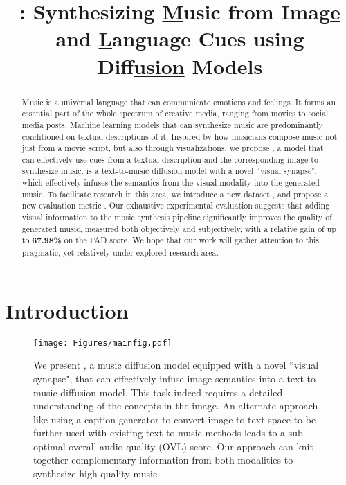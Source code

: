 \title{\modelname: Synthesizing \underline{M}usic from Imag\underline{e} and \underline{L}anguage Cues using \\ Dif\underline{fusion} Models}



\maketitle
\begin{abstract}
\label{abstract}

Music is a universal language that can communicate emotions and feelings. It forms an essential part of the whole spectrum of creative media, ranging from movies to social media posts. Machine learning models that can synthesize music are predominantly conditioned on textual descriptions of it. Inspired by how musicians compose music not just from a movie script, but also through visualizations, we propose \modelname, a model that can effectively use cues from a textual description and the corresponding image to synthesize music. \modelname is a text-to-music diffusion model with a novel ``visual synapse", which effectively infuses the semantics from the visual modality into the generated music. To facilitate research in this area, we introduce a new dataset \ourdataset, and propose a new evaluation metric \imagemusicmetric. Our exhaustive experimental evaluation suggests that adding visual information to the music synthesis pipeline significantly improves the quality of generated music, measured both objectively and subjectively, with a relative gain of up to \textbf{67.98\%} on the FAD score. We hope that our work will gather attention to this pragmatic, yet relatively under-explored research area.


\end{abstract}

\vspace{-4.9mm}
   
\section{Introduction}
\label{sec:intro}

\begin{figure}
    \centering
    \texttt{[image: Figures/mainfig.pdf]}
    \caption{
    We present \modelname, a music diffusion model equipped with a novel ``visual synapse", that can effectively infuse image semantics into a text-to-music diffusion model. This task indeed requires a detailed understanding of the concepts in the image. An alternate approach like using a caption generator to convert image to text space to be further used with existing text-to-music methods leads to a sub-optimal overall audio quality (OVL) score. Our approach can knit together complementary information from both modalities to synthesize high-quality music. 
    }
    \label{fig:teaser}
\end{figure}

